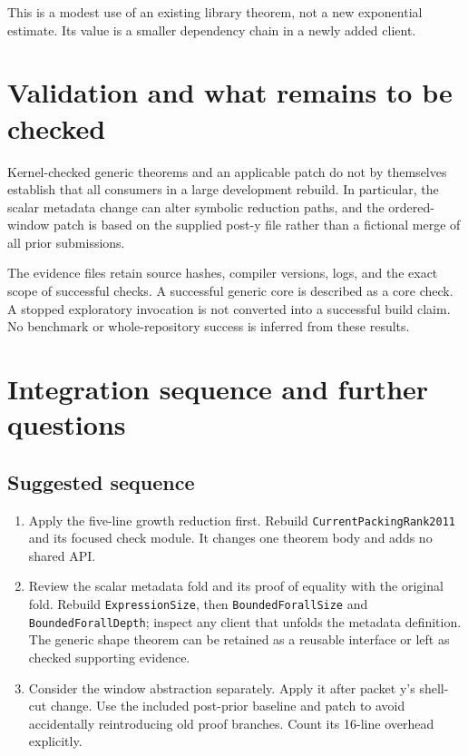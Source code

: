 \documentclass[11pt,letterpaper]{article}
\newcommand{\code}[1]{\texttt{\small #1}}
\begin{document}
This is a modest use of an existing library theorem, not a new exponential estimate. Its value is a smaller dependency chain in a newly added client.

\section{Validation and what remains to be checked}



Kernel-checked generic theorems and an applicable patch do not by themselves establish that all consumers in a large development rebuild. In particular, the scalar metadata change can alter symbolic reduction paths, and the ordered-window patch is based on the supplied post-y file rather than a fictional merge of all prior submissions.

The evidence files retain source hashes, compiler versions, logs, and the exact scope of successful checks. A successful generic core is described as a core check. A stopped exploratory invocation is not converted into a successful build claim. No benchmark or whole-repository success is inferred from these results.

\section{Integration sequence and further questions}

\subsection{Suggested sequence}

\begin{enumerate}
\item Apply the five-line growth reduction first. Rebuild \code{CurrentPackingRank2011} and its focused check module. It changes one theorem body and adds no shared API.
\item Review the scalar metadata fold and its proof of equality with the original fold. Rebuild \code{ExpressionSize}, then \code{BoundedForallSize} and \code{BoundedForallDepth}; inspect any client that unfolds the metadata definition. The generic shape theorem can be retained as a reusable interface or left as checked supporting evidence.
\item Consider the window abstraction separately. Apply it after packet y's shell-cut change. Use the included post-prior baseline and patch to avoid accidentally reintroducing old proof branches. Count its 16-line overhead explicitly.
\end{enumerate}
\end{document}
